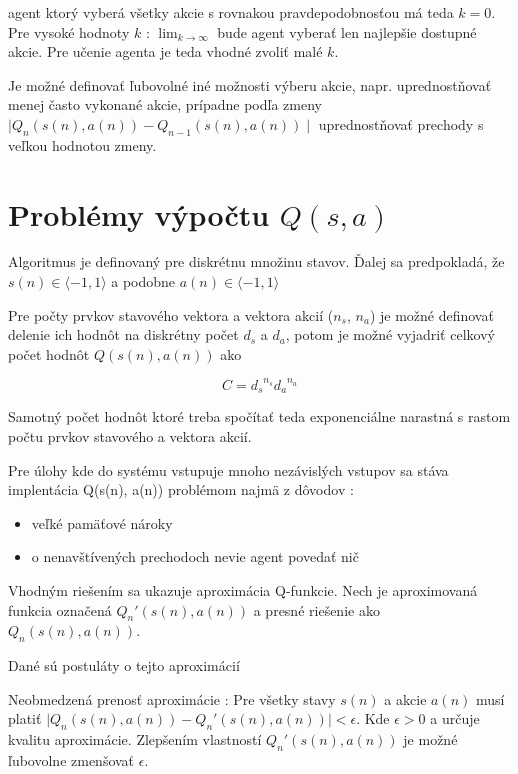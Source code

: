 agent ktorý vyberá všetky akcie s rovnakou pravdepodobnosťou má teda $k = 0$.
Pre vysoké hodnoty $k$ : $\lim_{k\to\infty}$ bude agent vyberať len najlepšie
dostupné akcie. Pre učenie agenta je teda vhodné zvoliť malé $k$.

Je možné definovať ľubovolné iné možnosti výberu akcie, napr. uprednostňovať menej
často vykonané akcie, prípadne podľa zmeny
$\mid Q_{n}(s(n), a(n)) - Q_{n-1}(s(n), a(n)) \mid$ uprednostňovať prechody s veľkou hodnotou zmeny.


\section{Problémy výpočtu $Q(s, a)$}

Algoritmus je definovaný pre diskrétnu množinu stavov. Ďalej sa predpokladá, že
$s(n) \in \langle -1, 1 \rangle$ a podobne $a(n) \in \langle -1, 1 \rangle$

 Pre počty prvkov
stavového vektora a vektora akcií ($n_s$, $n_a$) je možné definovať
delenie ich hodnôt na diskrétny počet $d_s$ a $d_a$, potom je možné vyjadriť celkový počet
hodnôt $Q(s(n), a(n))$ ako

\begin{equation}
C = {d_s}^{n_s} {d_a}^{n_a}
\label{eq:q_size}
\end{equation}

Samotný počet hodnôt ktoré treba spočítať teda exponenciálne narastná s rastom
počtu prvkov stavového a vektora akcií.

Pre úlohy kde do systému vstupuje mnoho nezávislých vstupov sa stáva implentácia Q(s(n), a(n))
problémom najmä z dôvodov :

\begin{itemize}
\item veľké pamäťové nároky
\item o nenavštívených prechodoch nevie agent povedať nič
\end{itemize}

Vhodným riešením sa ukazuje aproximácia Q-funkcie.
Nech je aproximovaná funkcia označená $Q_n'(s(n), a(n))$ a presné riešenie ako $Q_n(s(n), a(n))$.

Dané sú postuláty o tejto aproximácií
\begin{theorem}{Neobmedzená prenosť aproximácie : }
\label{post:01}
Pre všetky stavy $s(n)$ a akcie $a(n)$ musí platiť
$\mid Q_n(s(n), a(n)) - Q_n'(s(n), a(n)) \mid < \epsilon $. Kde $\epsilon > 0$ a
určuje kvalitu aproximácie. Zlepšením vlastností $Q_n'(s(n), a(n))$ je možné
ľubovolne zmenšovať  $\epsilon$.
\end{theorem}

